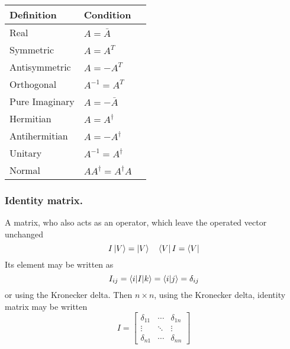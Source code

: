 \documentclass[../main.tex]{subfiles}
\begin{document}
\begin{table}[h]
	\centering
	\begin{tabular}{@{}llr@{}}
		\toprule
		Definition     & Condition                   \\
		\midrule
		Real           & $A=\bar{A}$                 \\
		Symmetric      & $A=A^T$                     \\
		Antisymmetric  & $A=-A^T$                    \\
		Orthogonal     & $A^{-1}=A^T$                \\
		Pure Imaginary & $A=-\bar{A}$                \\
		Hermitian      & $A=A^{\dagger}$             \\
		Antihermitian  & $A=-A^{\dagger}$            \\
		Unitary        & $A^{-1}=A^{\dagger}$        \\
		Normal         & $AA^{\dagger}=A^{\dagger}A$ \\
		\bottomrule
	\end{tabular}
\end{table}

\subsubsection{Identity matrix.}
A matrix, who also acts as an operator, which leave the operated vector unchanged
\begin{equation*}
	I \ket{V}=\ket{V}\quad \bra{V}I=\bra{V}
\end{equation*}
Its element may be written as
\begin{equation*}
	I_{ij} =\braket{i|I|k}=\braket{i|j}=\delta_{ij}
\end{equation*}
or using the Kronecker delta.
Then $n\times n$, using the Kronecker delta, identity matrix may be written
\begin{equation*}
	I = \begin{bmatrix}
		\delta_{11} & \cdots & \delta_{1n} \\
		\vdots      & \ddots & \vdots      \\
		\delta_{n1} & \cdots & \delta_{nn}
	\end{bmatrix}
\end{equation*}
\end{document}
